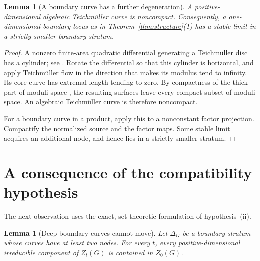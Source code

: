 \documentclass[11pt]{article}
\newtheorem{lemma}[theorem]{Lemma}
\theoremstyle{remark}
\begin{document}
\begin{lemma}[A boundary curve has a further degeneration]
\label{lem:cusp}
A positive-dimensional algebraic Teichm\"uller curve is
noncompact. Consequently, a one-dimensional boundary locus as
in Theorem~\ref{thm:structure}(1) has a stable limit in a strictly
smaller boundary stratum.
\end{lemma}

\begin{proof}
A nonzero finite-area quadratic differential generating a
Teichm\"uller disc has a cylinder; see \cite{Masur}.
Rotate the differential so that this cylinder is horizontal,
and apply Teichm\"uller flow in the direction that makes its
modulus tend to infinity. Its core curve has extremal length
tending to zero. By compactness of the thick part of moduli
space \cite{Mumford}, the resulting surfaces leave every compact
subset of moduli space. An algebraic Teichm\"uller curve is
therefore noncompact.

For a boundary curve in a product, apply this to a nonconstant
factor projection. Compactify the normalized source and the
factor maps. Some stable limit acquires an additional node,
and hence lies in a strictly smaller stratum.
\end{proof}

\section{A consequence of the compatibility hypothesis}

The next observation uses the exact, set-theoretic formulation
of hypothesis~(ii).

\begin{lemma}[Deep boundary curves cannot move]\label{lem:deep}
Let \(\Delta_G\) be a boundary stratum whose curves have at least
two nodes. For every \(t\), every positive-dimensional
irreducible component of \(Z_t(G)\) is contained in \(Z_0(G)\).
\end{lemma}
\end{document}
